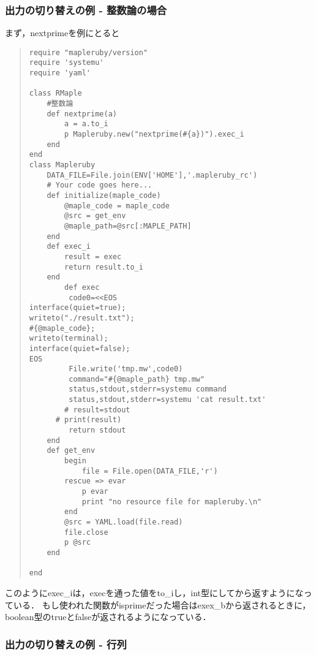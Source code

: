 \subsubsection{出力の切り替えの例 - 整数論の場合}
まず，nextprimeを例にとると
\begin{quote}\begin{verbatim}
require "mapleruby/version"
require 'systemu'
require 'yaml'

class RMaple
	#整数論
	def nextprime(a)
		a = a.to_i
		p Mapleruby.new("nextprime(#{a})").exec_i
	end
end
class Mapleruby
	DATA_FILE=File.join(ENV['HOME'],'.mapleruby_rc')
	# Your code goes here...
	def initialize(maple_code)
		@maple_code = maple_code
		@src = get_env
		@maple_path=@src[:MAPLE_PATH]
	end
	def exec_i
		result = exec
		return result.to_i
	end
		def exec
		 code0=<<EOS
interface(quiet=true);
writeto("./result.txt");
#{@maple_code};
writeto(terminal);
interface(quiet=false);
EOS
		 File.write('tmp.mw',code0)
		 command="#{@maple_path} tmp.mw"
		 status,stdout,stderr=systemu command
		 status,stdout,stderr=systemu 'cat result.txt'
		# result=stdout
	  # print(result)
		 return stdout
	end
	def get_env
		begin
			file = File.open(DATA_FILE,'r')
		rescue => evar
			p evar
			print "no resource file for mapleruby.\n"
		end
		@src = YAML.load(file.read)
		file.close
		p @src
	end

end
\end{verbatim}\end{quote}
このようにexec\_iは，execを通った値をto\_iし，int型にしてから返すようになっている．
もし使われた関数がisprimeだった場合はexex\_bから返されるときに，boolean型のtrueとfalseが返されるようになっている．

\subsubsection{出力の切り替えの例 - 行列}
